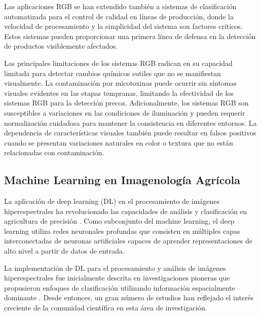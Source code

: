 \vspace{5mm}

Las aplicaciones RGB se han extendido también a sistemas de clasificación automatizada para el control de calidad en líneas de producción, donde la velocidad de procesamiento y la simplicidad del sistema son factores críticos. Estos sistemas pueden proporcionar una primera línea de defensa en la detección de productos visiblemente afectados.

\vspace{5mm}

Las principales limitaciones de los sistemas RGB radican en su capacidad limitada para detectar cambios químicos sutiles que no se manifiestan visualmente. La contaminación por micotoxinas puede ocurrir sin síntomas visuales evidentes en las etapas tempranas, limitando la efectividad de los sistemas RGB para la detección precoz. Adicionalmente, los sistemas RGB son susceptibles a variaciones en las condiciones de iluminación y pueden requerir normalización cuidadosa para mantener la consistencia en diferentes entornos. La dependencia de características visuales también puede resultar en falsos positivos cuando se presentan variaciones naturales en color o textura que no están relacionadas con contaminación.

\subsection{Machine Learning en Imagenología Agrícola}

La aplicación de deep learning (DL) en el procesamiento de imágenes hiperespectrales ha revolucionado las capacidades de análisis y clasificación en agricultura de precisión \cite{PAOLETTI2019279}. Como subconjunto del machine learning, el deep learning utiliza redes neuronales profundas que consisten en múltiples capas interconectadas de neuronas artificiales capaces de aprender representaciones de alto nivel a partir de datos de entrada.

\vspace{5mm}

La implementación de DL para el procesamiento y análisis de imágenes hiperespectrales fue inicialmente descrita en investigaciones pioneras que propusieron enfoques de clasificación utilizando información espacialmente dominante \cite{chen2014deep}. Desde entonces, un gran número de estudios han reflejado el interés creciente de la comunidad científica en esta área de investigación.

\vspace{5mm}

